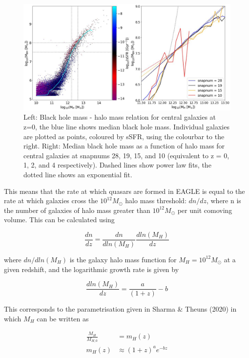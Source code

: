 \documentclass[12pt, twocolumn]{revtex4}    %
\begin{document}
\begin{figure}[H]
\centering
\includegraphics[width=17cm]{Plot_3.jpeg}
\caption{Left: Black hole mass - halo mass relation for central galaxies at z=0, the blue line shows median black hole mass. Individual galaxies are plotted as points, coloured by sSFR, using the colourbar to the right. Right: Median black hole mass as a function of halo mass for central galaxies at snapnums 28, 19, 15, and 10 (equivalent to z = 0, 1, 2, and 4 respectively). Dashed lines show power law fits, the dotted line shows an exponential fit.}
\label{fig:4}
\end{figure}
\twocolumngrid


This means that the rate at which quasars are formed in EAGLE is equal to the rate at which galaxies cross the $10^{12}M_\odot$ halo mass threshold: $dn/dz$, where n is the number of galaxies of halo mass greater than $10^{12}M_\odot$ per unit comoving volume. This can be calculated using

\begin{equation}
    \frac{dn}{dz}=\frac{dn}{dln(M_H)}\frac{dln(M_H)}{dz}
\end{equation}

\noindent where $dn/dln(M_H)$ is the galaxy halo mass function for $M_H=10^{12}M_\odot$ at a given redshift, and the logarithmic growth rate is given by

\begin{equation}
    \frac{dln(M_H)}{dz}=\frac{a}{(1+z)}-b
\end{equation}

\noindent This corresponds to the parametrisation given in Sharma \& Theuns (2020) in which $M_H$ can be written as

\begin{align}
    \frac{M_H}{M_{H,0}}&=m_H(z) \nonumber \\
    m_H(z)&\approx(1+z)^ae^{-bz}
\end{align}
\end{document}
